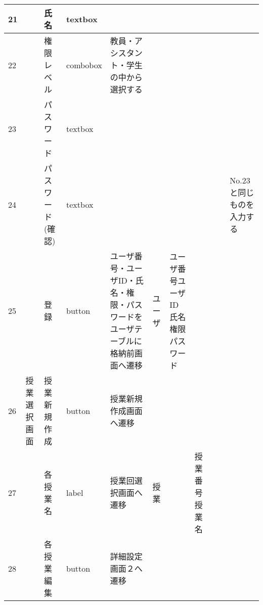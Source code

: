 \begin{table}[]
\begin{tabular}{|l|l|l|l|l|l|l|l|l|l|l|}
21  &               & 氏名               & textbox  &                                                                   &         &                       &                    &                 &                               &                                                                \\ \hline
22  &               & 権限レベル            & combobox & 教員・アシスタント・学生の中から選択する                                              &         &                       &                    &                 &                               &                                                                \\ \hline
23  &               & パスワード            & textbox  &                                                                   &         &                       &                    &                 &                               &                                                                \\ \hline
24  &               & パスワード(確認)        & textbox  &                                                                   &         &                       &                    &                 &                               & No.23と同じものを入力する                                                \\ \hline
25  &               & 登録               & button   & ユーザ番号・ユーザID・氏名・権限・パスワードをユーザテーブルに格納前画面へ遷移                          & ユーザ     & ユーザ番号ユーザID氏名権限パスワード   &                    &                 &                               &                                                                \\ \hline
26  & 授業選択画面        & 授業新規作成           & button   & 授業新規作成画面へ遷移                                                       &         &                       &                    &                 &                               &                                                                \\ \hline
27  &               & 各授業名             & label    & 授業回選択画面へ遷移                                                        & 授業      &                       & 授業番号授業名            &                 &                               &                                                                \\ \hline
28  &               & 各授業編集            & button   & 詳細設定画面２へ遷移                                                        &         &                       &                    &                 &                               &                                                                \\ \hline

\end{tabular}
\end{table}
